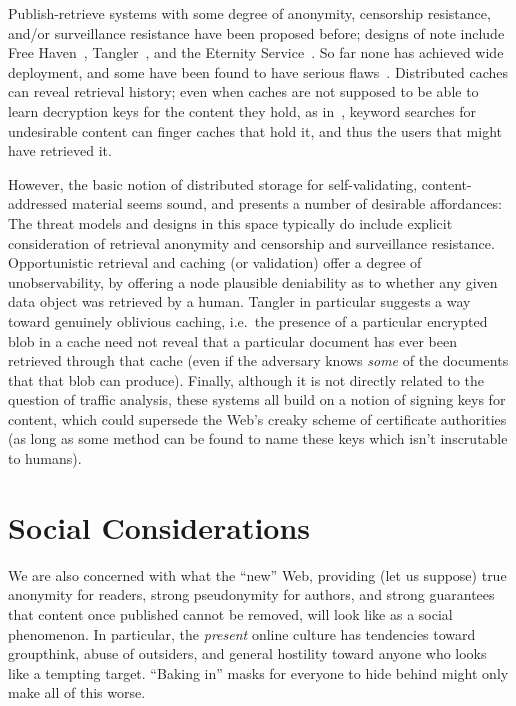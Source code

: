 \documentclass[oneside]{zarticle}
\begin{document}
Publish-retrieve systems with some degree of anonymity, censorship
resistance, and/or surveillance resistance have been proposed before;
designs of note include Free Haven~\cite{dingledine2000freehaven},
Tangler~\cite{waldman2001tangler}, and the Eternity
Service~\cite{anderson1996eternity, benes2001strongeternity}. So far
none has achieved wide deployment, and some have been found to have
serious flaws~\cite{kugler2003gnunet}.  Distributed caches can reveal
retrieval history; even when caches are not supposed to be able to
learn decryption keys for the content they hold, as
in~\textcite{serjantov2002anonymizing}, keyword searches for
undesirable content can finger caches that hold it, and thus the users
that might have retrieved it.

However, the basic notion of distributed storage for self-validating,
content-addressed material seems sound, and presents a number of
desirable affordances: The threat models and designs in this space
typically do include explicit consideration of retrieval anonymity and
censorship and surveillance resistance.  Opportunistic retrieval and
caching (or validation) offer a degree of unobservability, by offering
a node plausible deniability as to whether any given data object was
retrieved by a human.  Tangler in particular suggests a way toward
genuinely oblivious caching, i.e.\ the presence of a particular
encrypted blob in a cache need not reveal that a particular document
has ever been retrieved through that cache (even if the adversary
knows \emph{some} of the documents that that blob can produce).
Finally, although it is not directly related to the question of
traffic analysis, these systems all build on a notion of signing keys
for content, which could supersede the Web's creaky scheme of
certificate authorities (as long as some method can be found to
name these keys which isn't inscrutable to humans).

\section{Social Considerations}

We are also concerned with what the “new” Web, providing (let us
suppose) true anonymity for readers, strong pseudonymity for authors,
and strong guarantees that content once published cannot be removed,
will look like as a social phenomenon.  In particular, the
\emph{present} online culture has tendencies toward groupthink, abuse
of outsiders, and general hostility toward anyone who looks like a
tempting target. “Baking in” masks for everyone to hide behind might
only make all of this worse.
\end{document}

